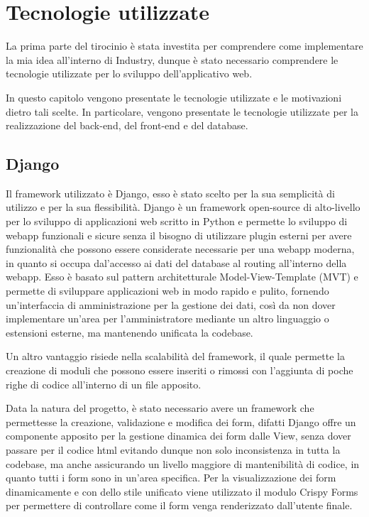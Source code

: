 \chapter{Tecnologie utilizzate}
\label{cha:tecnologie_utilizzate}

La prima parte del tirocinio è stata investita per comprendere come implementare la mia idea all'interno di Industry, dunque è stato necessario comprendere le tecnologie utilizzate per lo sviluppo dell'applicativo web. 

In questo capitolo vengono presentate le tecnologie utilizzate e le motivazioni dietro tali scelte. In particolare, vengono presentate le tecnologie utilizzate per la realizzazione del back-end, del front-end e del database.

\section{Django}
Il framework utilizzato è Django, esso è stato scelto per la sua semplicità di utilizzo e per la sua flessibilità. Django è un framework open-source di alto-livello per lo sviluppo di applicazioni web scritto in Python e permette lo sviluppo di webapp funzionali e sicure senza il bisogno di utilizzare plugin esterni per avere funzionalità che possono essere considerate necessarie per una webapp moderna, in quanto si occupa dal'accesso ai dati del database al routing all'interno della webapp. Esso è basato sul pattern architetturale Model-View-Template (MVT) e permette di sviluppare applicazioni web in modo rapido e pulito, fornendo un'interfaccia di amministrazione per la gestione dei dati, così da non dover implementare un'area per l'amministratore mediante un altro linguaggio o estensioni esterne, ma mantenendo unificata la codebase.

Un altro vantaggio risiede nella scalabilità del framework, il quale permette la creazione di moduli che possono essere inseriti o rimossi con l'aggiunta di poche righe di codice all'interno di un file apposito.


Data la natura del progetto, è stato necessario avere un framework che permettesse la creazione, validazione e modifica dei form, difatti Django offre un componente apposito per la gestione dinamica dei form dalle View, senza dover passare per il codice html evitando dunque non solo inconsistenza in tutta la codebase, ma anche assicurando un livello maggiore di mantenibilità di codice, in quanto tutti i form sono in un'area specifica. Per la visualizzazione dei form dinamicamente e con dello stile unificato viene utilizzato il modulo Crispy Forms per permettere di controllare come il form venga renderizzato dall'utente finale. \cite{crispy_forms}


